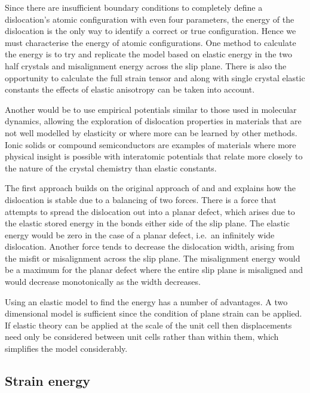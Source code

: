

Since there are insufficient boundary conditions to completely define a dislocation's atomic configuration with even four parameters, the energy of the dislocation is the only way to identify a correct or true configuration. Hence we must characterise the energy of atomic configurations. One method to calculate the energy is to try and replicate the model based on elastic energy in the two half crystals and misalignment energy across the slip plane. There is also the opportunity to calculate the full strain tensor and along with single crystal elastic constants the effects of elastic anisotropy can be taken into account. 

Another would be to use empirical potentials similar to those used in molecular dynamics, allowing the exploration of dislocation properties in materials that are not well modelled by elasticity or where more can be learned by other methods. Ionic solids or compound semiconductors are examples of materials where more physical insight is possible with interatomic potentials that relate more closely to the nature of the crystal chemistry than elastic constants. 



The first approach builds on the original approach of \citet{Peierls1940} and \citet{Nabarro1947} and explains how the dislocation is stable due to a balancing of two forces. There is a force that attempts to spread the dislocation out into a planar defect, which arises due to the elastic stored energy in the bonds either side of the slip plane. The elastic energy would be zero in the case of a planar defect, i.e.\ an infinitely wide dislocation. Another force tends to decrease the dislocation width, arising from the misfit or misalignment across the slip plane. The misalignment energy would be a maximum for the planar defect where the entire slip plane is misaligned and would decrease monotonically as the width decreases.

Using an elastic model to find the energy has a number of advantages. A two dimensional model is sufficient since the condition of plane strain can be applied. If elastic theory can be applied at the scale of the unit cell then displacements need only be considered between unit cells rather than within them, which simplifies the model considerably.

\subsection{Strain energy}

